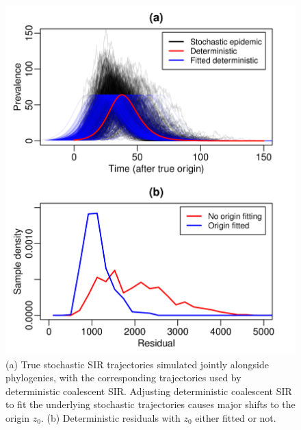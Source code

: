 \documentclass[10pt]{article}
\newcommand{\deterCoalSIR}{deterministic coalescent SIR}
\begin{document}
\begin{figure}
  \includegraphics[width=\textwidth]{originFitFigure.jpg}
  \caption{(a) True stochastic SIR trajectories simulated jointly alongside phylogenies, with 
  the corresponding trajectories used by \deterCoalSIR{}.  Adjusting \deterCoalSIR{} 
  to fit the underlying stochastic trajectories causes major shifts to the origin $z_0$.  
  (b) Deterministic residuals with $z_0$ either fitted or not.}
  \label{fig:originFit}
\end{figure}
%
%
\end{document}
